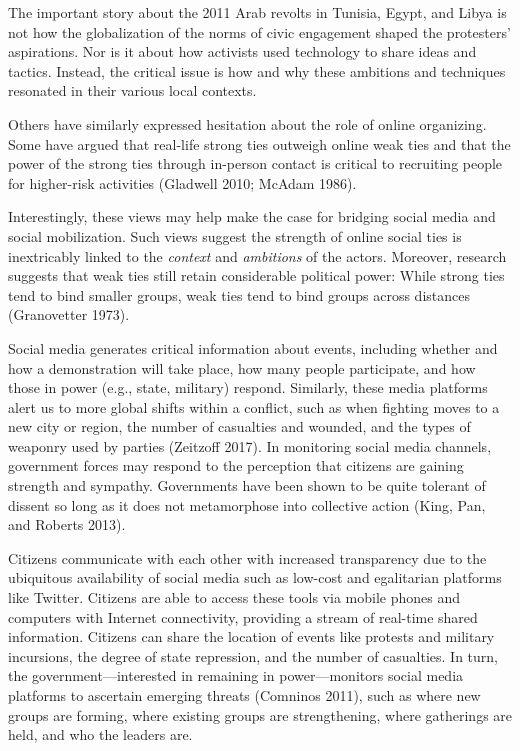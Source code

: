 \documentclass[english,man]{apa6}
\begin{document}
\begin{singlespace}
\setlength{\leftskip}{1cm}

\noindent The important story about the 2011
Arab revolts in Tunisia, Egypt, and Libya is not how the globalization of the
norms of civic engagement shaped the protesters' aspirations. Nor is it about
how activists used technology to share ideas and tactics. Instead, the critical
issue is how and why these ambitions and techniques resonated in their various
local contexts.

\setlength{\leftskip}{0pt}
\end{singlespace}

\noindent Others have similarly expressed hesitation about the role of online
organizing. Some have argued that real-life strong ties outweigh online weak
ties and that the power of the strong ties through in-person contact is critical
to recruiting people for higher-risk activities (Gladwell 2010; McAdam 1986).

Interestingly, these views may help make the case for bridging social media and
social mobilization. Such views suggest the strength of online social ties is
inextricably linked to the \emph{context} and \emph{ambitions} of the actors. Moreover,
research suggests that weak ties still retain considerable political power:
While strong ties tend to bind smaller groups, weak ties tend to bind groups
across distances (Granovetter 1973).

Social media generates critical information about events, including whether and
how a demonstration will take place, how many people participate, and how those
in power (e.g., state, military) respond. Similarly, these media platforms alert
us to more global shifts within a conflict, such as when fighting moves to a new
city or region, the number of casualties and wounded, and the types of weaponry
used by parties (Zeitzoff 2017). In monitoring social media channels,
government forces may respond to the perception that citizens are gaining
strength and sympathy. Governments have been shown to be quite tolerant of
dissent so long as it does not metamorphose into collective action
(King, Pan, and Roberts 2013).

Citizens communicate with each other with increased transparency due to the
ubiquitous availability of social media such as low-cost and egalitarian
platforms like Twitter. Citizens are able to access these tools via mobile
phones and computers with Internet connectivity, providing a stream of real-time
shared information. Citizens can share the location of events like protests and
military incursions, the degree of state repression, and the number of
casualties. In turn, the government---interested in remaining in
power---monitors social media platforms to ascertain emerging threats
(Comninos 2011), such as where new groups are forming, where existing
groups are strengthening, where gatherings are held, and who the leaders are.
\end{document}
